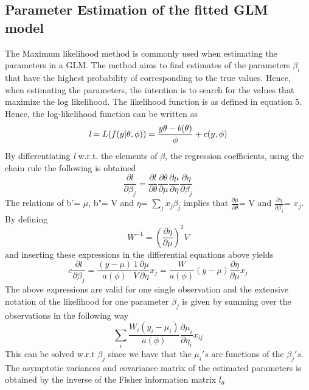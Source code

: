 \subsection{Parameter Estimation of the fitted GLM model}
The Maximum likelihood method is commonly used when estimating the parameters in a GLM. The method aims to find estimates of the parameters $\beta_{i}$ that have the highest probability of corresponding to the true values. Hence, when estimating the parameters, the intention is to search for the values that maximize the log likelihood. The likelihood function is as defined in equation 5.\\
Hence, the log-likelihood function can be written as
\begin{equation}
	\centering
	\textit{l} = L(f(y|\theta,\phi)) = \frac{y\theta-b(\theta)}{\phi} + c(y,\phi)
\end{equation}
By differentiating \textit{l} w.r.t. the elements of $\beta$, the regression coefficients, using the chain rule the following is obtained
\begin{equation}
	\frac{\partial \textit{l}}{\partial \beta_{j}} = \frac{\partial \textit{l}}{\partial \theta} \frac{\partial \theta}{\partial \mu} \frac{\partial \mu}{\partial \eta} \frac{\partial \eta}{\partial \beta_{j}}
\end{equation}
The relations of b'= $\mu$, b"= V and $\eta$= $\sum_{j}x_{j}\beta_{j}$ implies that $\frac{\partial \mu}{\partial \theta}$= V and $\frac{\partial \eta}{\partial \beta_{j}}$= $x_{j}$.\\
By defining 
\begin{equation}
	W^{-1}= (\frac{\partial \eta}{\partial \mu})^{2} V
\end{equation}
and inserting these expressions in the differential equations above yields
\begin{equation}
	c\frac{\partial \textit{l}}{\partial \beta_{j}}= \frac{(y-\mu)}{a(\phi)} \frac{1}{V} \frac{\partial \mu}{\partial \eta} x_{j} = \frac{W}{a(\phi)} (y-\mu)\frac{\partial \eta}{\partial \mu}x_{j}
\end{equation}
The above expressions are valid for one single observation and the extensive notation of the likelihood for one parameter $\beta_{j}$ is given by summing over the observations in the following way
\begin{equation}
	\sum_{i}^{}\frac{W_{i}(y_{i}-\mu_{i})}{a(\phi)}\frac{\partial \mu_{i}}{\partial \eta_{i}} x_{ij}
\end{equation}
This can be solved w.r.t $\beta_{j}$ since we have that the $\mu_{i}'s$ are functions of the $\beta_{j}'s$. The asymptotic variances and covariance matrix of the estimated parameters is obtained by the inverse of the Fisher information matrix \textit{$l_{\theta}$}

